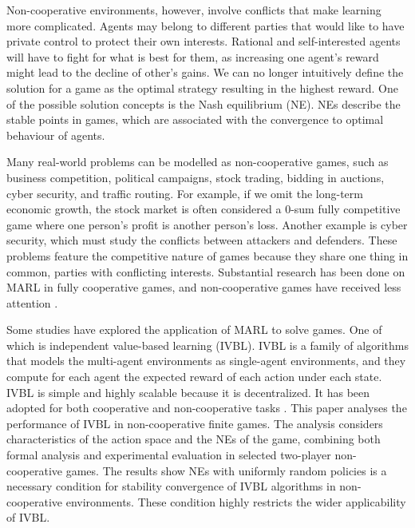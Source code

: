 \documentclass[]{interact}
\theoremstyle{plain}%
\theoremstyle{definition}
\theoremstyle{remark}
\begin{document}
Non-cooperative environments, however, involve conflicts that make learning more complicated. Agents may belong to different parties that would like to have private control to protect their own interests. Rational and self-interested agents will have to fight for what is best for them, as increasing one agent's reward might lead to the decline of other's gains. We can no longer intuitively define the solution for a game as the optimal strategy resulting in the highest reward. One of the possible solution concepts is the Nash equilibrium (NE). NEs describe the stable points in games, which are associated with the convergence to optimal behaviour of agents.

Many real-world problems can be modelled as non-cooperative games, such as business competition, political campaigns, stock trading, bidding in auctions, cyber security, and traffic routing. For example, if we omit the long-term economic growth, the stock market is often considered a 0-sum fully competitive game where one person's profit is another person's loss. Another example is cyber security, which must study the conflicts between attackers and defenders. These problems feature the competitive nature of games because they share one thing in common, parties with conflicting interests. Substantial research has been done on MARL in fully cooperative games, and non-cooperative games have received less attention \cite{zhu2024survey, li2024fightladder}.

Some studies have explored the application of MARL to solve games. One of which is independent value-based learning (IVBL). IVBL is a family of algorithms that models the multi-agent environments as single-agent environments, and they compute for each agent the expected reward of each action under each state. IVBL is simple and highly scalable because it is decentralized. It has been adopted for both cooperative \cite{foerster2017stabilising, omidshafiei2017deep, palmer2017lenient, palmer2018negative} and non-cooperative tasks \cite{bjornsson2009cadiaplayer, jiang2018q, qu2020distributed, kopacz2023evaluating}. This paper analyses the performance of IVBL in non-cooperative finite games. The analysis considers characteristics of the action space and the NEs of the game, combining both formal analysis and experimental evaluation in selected two-player non-cooperative games. The results show NEs with uniformly random policies is a necessary condition for stability convergence of IVBL algorithms in non-cooperative environments. These condition highly restricts the wider applicability of IVBL.
\end{document}
